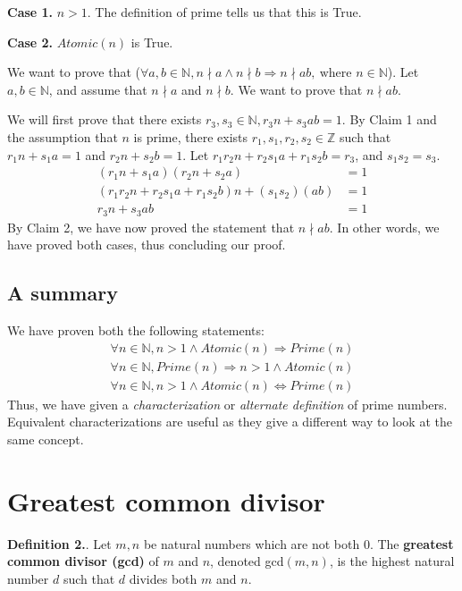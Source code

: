 \documentclass{article}
\newcounter{defcount}
\newcommand\df{\stepcounter{defcount} \textbf{Definition 2.\thedefcount}. }
\begin{document}
\textbf{Case 1.} $n > 1$. The definition of prime tells us that this is True.

\textbf{Case 2.} $Atomic(n)$ is True. 

We want to prove that ($\forall a, b \in \mathbb{N}, n \nmid a \land
n \nmid b \Rightarrow n \nmid ab, \: \text{where } n \in \mathbb{N}$). 
Let $a, b \in \mathbb{N}$, and assume that $n \nmid a$ and $n \nmid b$. We 
want to prove that $n \nmid ab$.

We will first prove that there exists $r_3, s_3 \in \mathbb{N}, r_3n + 
s_3ab = 1$. By Claim 1 and the assumption that $n$ is prime, there exists 
$r_1, s_1, r_2, s_2 \in \mathbb{Z}$ such that $r_1n + s_1a = 1$ and 
$r_2n + s_2b = 1$. Let $r_1r_2n + r_2s_1a + r_1s_2b = r_3$, and $s_1s_2 = s_3$.
\begin{align*}
    (r_1n + s_1a)(r_2n + s_2a) &= 1 \\
    (r_1r_2n + r_2s_1a + r_1s_2b)n + (s_1s_2) (ab) &= 1 \\ 
    r_3n + s_3ab &= 1
\end{align*}
By Claim 2, we have now proved the statement that $n \nmid ab$. In other words, 
we have proved both cases, thus concluding our proof. 

\subsection{A summary}
We have proven both the following statements:
\begin{align*}
    \forall n \in \mathbb{N}, n > 1 \land Atomic(n) \Rightarrow Prime(n) \\
    \forall n \in \mathbb{N}, Prime(n) \Rightarrow n > 1 \land Atomic(n) \\
    \forall n \in \mathbb{N}, n > 1 \land Atomic(n) \Leftrightarrow Prime(n)
\end{align*}
Thus, we have given a \textit{characterization} or \textit{alternate definition} 
of prime numbers. Equivalent characterizations are useful as they give a 
different way to look at the same concept. 

\section{Greatest common divisor}
\df Let $m, n$ be natural numbers which are not both 0. The \textbf{greatest 
common divisor (gcd)} of $m$ and $n$, denoted gcd$(m,n)$, is the highest 
natural number $d$ such that $d$ divides both $m$ and $n$. 
\end{document}
